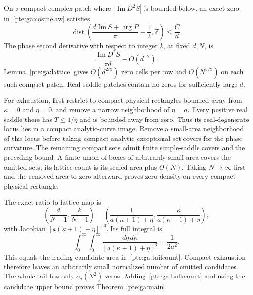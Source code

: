 \documentclass[11pt,a4paper]{article}
\numberwithin{equation}{section}
\theoremstyle{definition}
\theoremstyle{plain}
\begin{document}
On a compact complex patch where $|\operatorname{Im}D^2S|$ is bounded below, an exact zero in~\eqref{pte:ga:cosinelaw} satisfies
\[
 \operatorname{dist}\!\left(
 \frac{d\operatorname{Im}S+\arg P}{\pi}-\frac12,\mathbb Z\right)
 \le\frac Cd.
\]
The phase second derivative with respect to integer $k$, at fixed $d,N$, is
\[
 \frac{\operatorname{Im}D^2S}{\pi d}+O(d^{-2}).
\]
Lemma~\ref{pte:ga:lattice} gives $O(d^{2/3})$ zero cells per row and $O(N^{5/3})$ on each such compact patch. Real-saddle patches contain no zeros for sufficiently large $d$.

For exhaustion, first restrict to compact physical rectangles bounded away from $\kappa=0$ and $\eta=0$, and remove a narrow neighborhood of $\eta=a$. Every positive real saddle there has $T\le1/\eta$ and is bounded away from zero. Thus its real-degenerate locus lies in a compact analytic-curve image. Remove a small-area neighborhood of this locus before taking compact analytic exceptional-set covers for the phase curvature. The remaining compact sets admit finite simple-saddle covers and the preceding bound. A finite union of boxes of arbitrarily small area covers the omitted sets; its lattice count is its scaled area plus $O(N)$. Taking $N\to\infty$ first and the removed area to zero afterward proves zero density on every compact physical rectangle.

The exact ratio-to-lattice map is
\[
 \left(\frac d{N-1},\frac k{N-1}\right)
 =\left(\frac1{a(\kappa+1)+\eta},
        \frac\kappa{a(\kappa+1)+\eta}\right),
\]
with Jacobian $[a(\kappa+1)+\eta]^{-3}$. Its full integral is
\begin{equation}\label{pte:ga:area}
 \int_0^\infty\int_0^\infty
 \frac{d\eta\,d\kappa}{[a(\kappa+1)+\eta]^3}
 =\frac1{2a^2}.
\end{equation}
This equals the leading candidate area in~\eqref{pte:ga:tailcount}. Compact exhaustion therefore leaves an arbitrarily small normalized number of omitted candidates. The whole tail has only $o_a(N^2)$ zeros. Adding~\eqref{pte:ga:bulkcount} and using the candidate upper bound proves Theorem~\ref{pte:ga:main}.
\end{document}
